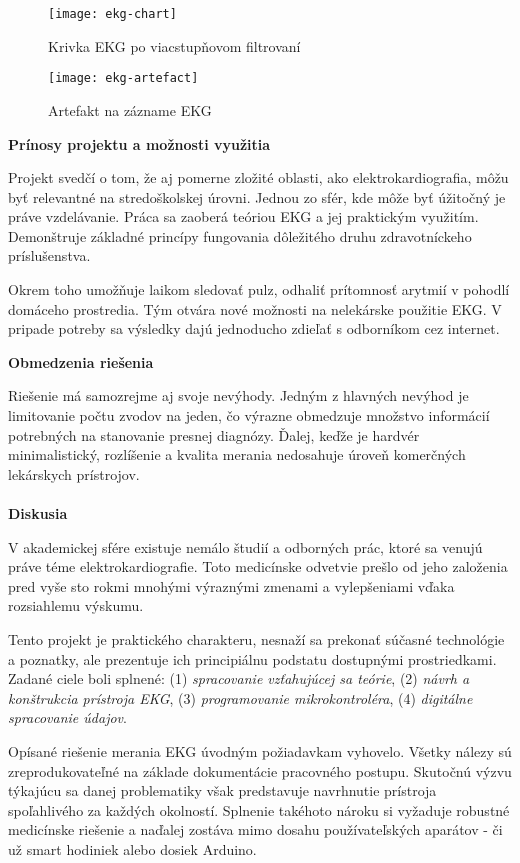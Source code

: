 \documentclass[titlepage,12pt]{article}
\begin{document}
\begin{figure}[!ht]
\begin{center}
\texttt{[image: ekg-chart]}
\caption{Krivka EKG po viacstupňovom filtrovaní}
\texttt{[image: ekg-artefact]}
\caption{Artefakt na zázname EKG}
\end{center}
\end{figure}

\textbf{Prínosy projektu a možnosti využitia}

Projekt svedčí o tom, že aj pomerne zložité oblasti, ako elektrokardiografia, môžu byť relevantné na stredoškolskej úrovni. Jednou zo sfér, kde môže byť úžitočný je práve vzdelávanie. Práca sa zaoberá teóriou EKG a jej praktickým využitím. Demonštruje základné princípy fungovania dôležitého druhu zdravotníckeho príslušenstva.

Okrem toho umožňuje laikom sledovať pulz, odhaliť prítomnosť arytmií v pohodlí domáceho prostredia. Tým otvára nové možnosti na nelekárske použitie EKG. V pripade potreby sa výsledky dajú jednoducho zdieľať s odborníkom cez internet.


\textbf{Obmedzenia riešenia}

Riešenie má samozrejme aj svoje nevýhody. Jedným z hlavných nevýhod je limitovanie počtu zvodov na jeden, čo výrazne obmedzuje množstvo informácií potrebných na stanovanie presnej diagnózy. Ďalej, keďže je hardvér minimalistický, rozlíšenie a kvalita merania nedosahuje úroveň komerčných lekárskych prístrojov.
\\
\\
\textbf{Diskusia}

V akademickej sfére existuje nemálo študií a odborných prác, ktoré sa venujú práve téme elektrokardiografie. Toto medicínske odvetvie prešlo od jeho založenia pred vyše sto rokmi mnohými výraznými zmenami a vylepšeniami vďaka rozsiahlemu výskumu.

Tento projekt je praktického charakteru, nesnaží sa prekonať súčasné technológie a poznatky, ale prezentuje ich principiálnu podstatu dostupnými prostriedkami.  Zadané ciele boli splnené: (1) \textit{spracovanie vzťahujúcej sa teórie}, (2) \textit{návrh a konštrukcia prístroja EKG}, (3) \textit{programovanie mikrokontroléra}, (4) \textit{digitálne spracovanie údajov}.

Opísané riešenie merania EKG úvodným požiadavkam vyhovelo. Všetky nálezy sú zreprodukovateľné na základe dokumentácie pracovného postupu. Skutočnú výzvu týkajúcu sa danej problematiky však predstavuje navrhnutie prístroja spoľahlivého za každých okolností. Splnenie takéhoto nároku si vyžaduje robustné medicínske riešenie a naďalej zostáva mimo dosahu používateľských aparátov - či už smart hodiniek alebo dosiek Arduino.
\end{document}
